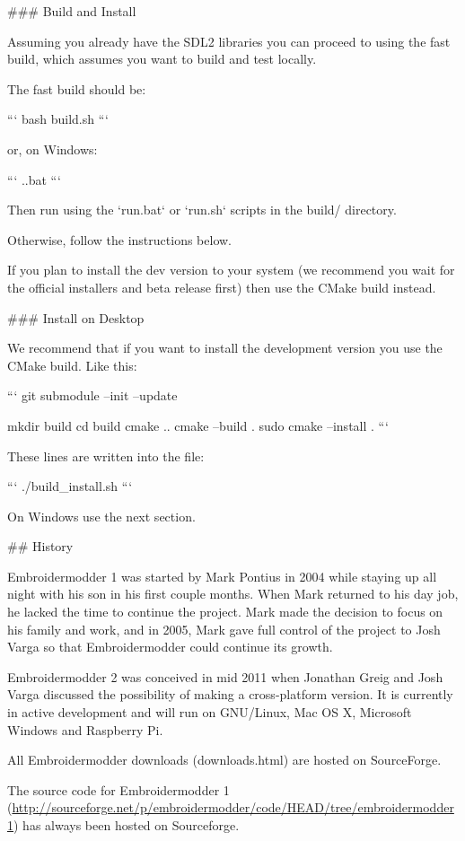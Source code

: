 
### Build and Install

Assuming you already have the SDL2 libraries you can proceed to using the fast build, which
assumes you want to build and test locally.

The fast build should be:

```
bash build.sh
```

or, on Windows:

```
.\build.bat
```

Then run using the `run.bat` or `run.sh` scripts in the build/ directory.

Otherwise, follow the instructions below.

If you plan to install the dev version to your system (we recommend you wait
for the official installers and beta release first) then use the CMake build
instead.

### Install on Desktop

We recommend that if you want to install the development version you use the CMake build. Like
this:

```
git submodule --init --update

mkdir build
cd build
cmake ..
cmake --build .
sudo cmake --install .
```

These lines are written into the file:

```
./build_install.sh
```

On Windows use the next section.

## History

Embroidermodder 1 was started by Mark Pontius in 2004 while staying up all night
with his son in his first couple months. When Mark returned to his day job, he
lacked the time to continue the project. Mark made the decision to focus on his
family and work, and in 2005, Mark gave full control of the project to Josh
Varga so that Embroidermodder could continue its growth.

Embroidermodder 2 was conceived in mid 2011 when Jonathan Greig and Josh Varga
discussed the possibility of making a cross-platform version. It is currently in
active development and will run on GNU/Linux, Mac OS X, Microsoft Windows and
Raspberry Pi.

All Embroidermodder downloads (downloads.html) are hosted on SourceForge.

The source code for Embroidermodder 1
(\url{http://sourceforge.net/p/embroidermodder/code/HEAD/tree/embroidermodder1})
has always been hosted on Sourceforge.

